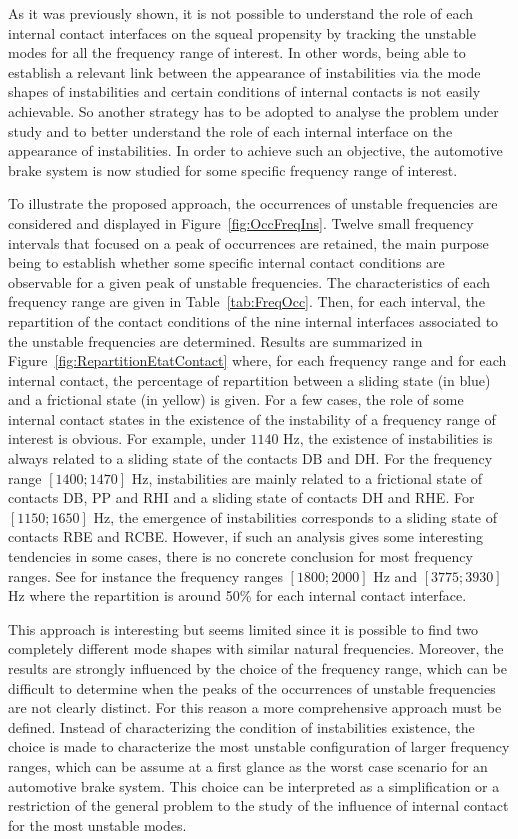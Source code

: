 \documentclass[final,1p]{elsarticle}
\begin{document}
 As it was previously shown, it is not possible to understand the role of each internal contact interfaces on the squeal propensity by tracking the unstable modes for all the frequency range of interest. In other words,  being able to establish a relevant link between the appearance of instabilities via the mode shapes of instabilities and certain conditions of internal contacts is not easily achievable. So another strategy has to be adopted to analyse the problem under study and to better understand the role of each internal interface on the appearance of instabilities. In order to achieve such an objective, the automotive brake system is now studied for some specific frequency range of interest.

To illustrate the proposed approach, the occurrences of unstable frequencies are considered and displayed in Figure~\ref{fig:OccFreqIns}. Twelve small frequency intervals that focused on a peak of occurrences are retained, the main purpose being to establish whether some specific internal contact conditions are observable for a given peak of unstable frequencies. The characteristics of each frequency range are given in Table~\ref{tab:FreqOcc}. Then, for each interval, the repartition of the contact conditions of the nine internal interfaces associated to the unstable frequencies are determined. Results are summarized in Figure~\ref{fig:RepartitionEtatContact} where, for each frequency range and for each internal contact, the percentage of repartition between a sliding state (in blue) and a frictional state (in yellow) is given. 
For a few cases, the role of some internal contact states in the existence of the instability of a frequency range of interest is obvious. For example, under $1140$ Hz, the existence of instabilities is always related to a sliding state of the contacts DB and DH. For the frequency range  $[1400;1470]$ Hz, instabilities are mainly related to a frictional state of contacts DB, PP and RHI and a sliding state of contacts DH and RHE. For $[1150;1650]$ Hz, the emergence of instabilities corresponds to a sliding state of contacts RBE and RCBE. However, if such an analysis gives some interesting tendencies in some cases, there is no concrete conclusion for most frequency ranges. See for instance the frequency ranges $[1800;2000]$ Hz and $[3775;3930]$ Hz where the repartition is around 50\% for each internal contact interface. 

This approach is interesting but seems limited since it is possible to find two completely different mode shapes with similar natural frequencies. Moreover, the results are strongly influenced by the choice of the frequency range, which can be difficult to determine when the peaks of the occurrences of unstable frequencies are not clearly distinct. For this reason a more comprehensive approach must be defined. Instead of characterizing the condition of instabilities existence, the choice is made to characterize the most unstable configuration of larger frequency ranges, which can be assume at a first glance as the worst case scenario for an automotive brake system. This choice can be interpreted as a simplification or a restriction of the general problem to the study of the influence of internal contact for the most unstable modes.
\end{document}
